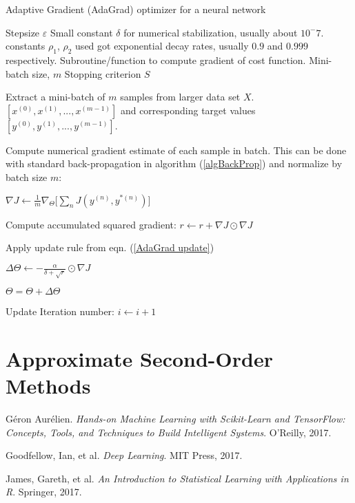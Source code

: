 \documentclass[12pt,letterpaper]{article}
\begin{document}
\begin{algorithm}[H]
\caption{Adaptive Gradient (AdaGrad) optimizer for a neural network}
\label{algAdaGrad}

\begin{algorithmic}

\REQUIRE Stepsize $\varepsilon$
\REQUIRE Small constant $\delta$ for numerical stabilization, usually about $10^-7$.
\REQUIRE constants $\rho_1$, $\rho_2$ used got exponential decay rates, usually $0.9$ and $0.999$ respectively.
\REQUIRE Subroutine/function to compute gradient of cost function.
\REQUIRE Mini-batch size, $m$
\REQUIRE Stopping criterion $S$

	\item Extract a mini-batch of $m$ samples from larger data set $X$. $[x^{(0)},x^{(1)},...,x^{(m-1)}]$ and corresponding target values 
	$[y^{(0)},y^{(1)},...,y^{(m-1)}]$.
	\item Compute numerical gradient estimate of each sample in batch. This can be done with standard back-propagation in algorithm (\ref{algBackProp}) and 			 	normalize by batch size $m$:
	\item $\nabla J \leftarrow \frac{1}{m}\nabla_{\Theta} \Big[ \sum_n J(y^{(n)},y^{*(n)}) \Big] $
	\item Compute accumulated squared gradient: $r \leftarrow r  + \nabla J \odot \nabla J$
	\item Apply update rule from eqn. (\ref{AdaGrad update})
	\item $\Delta \Theta \leftarrow -\frac{\alpha}{\delta+\sqrt{r}} \odot \nabla J$
	\item $\Theta = \Theta + \Delta \Theta$	
	\item Update Iteration number: $i \leftarrow i + 1$
\ENDWHILE

\end{algorithmic}
\end{algorithm}


\section{Approximate Second-Order Methods}



\begin{thebibliography}{9}


Géron Aurélien. \textit{Hands-on Machine Learning with Scikit-Learn and TensorFlow: Concepts, Tools, and Techniques to Build Intelligent Systems}. O'Reilly, 2017.

Goodfellow, Ian, et al. \textit{Deep Learning}. MIT Press, 2017.

James, Gareth, et al. \textit{An Introduction to Statistical Learning with Applications in R}. Springer, 2017.


\end{thebibliography}


\end{document}
